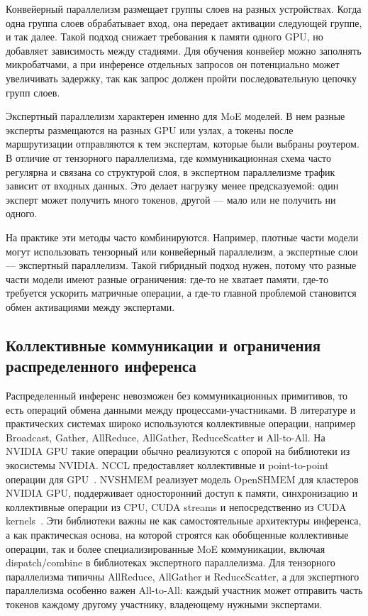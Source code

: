 Конвейерный параллелизм размещает группы слоев на разных устройствах. Когда одна группа слоев обрабатывает вход, она передает активации следующей группе, и так далее. Такой подход снижает требования к памяти одного GPU, но добавляет зависимость между стадиями. Для обучения конвейер можно заполнять микробатчами, а при инференсе отдельных запросов он потенциально может увеличивать задержку, так как запрос должен пройти последовательную цепочку групп слоев.

Экспертный параллелизм характерен именно для MoE моделей. В нем разные эксперты размещаются на разных GPU или узлах, а токены после маршрутизации отправляются к тем экспертам, которые были выбраны роутером. В отличие от тензорного параллелизма, где коммуникационная схема часто регулярна и связана со структурой слоя, в экспертном параллелизме трафик зависит от входных данных. Это делает нагрузку менее предсказуемой: один эксперт может получить много токенов, другой --- мало или не получить ни одного.

На практике эти методы часто комбинируются. Например, плотные части модели могут использовать тензорный или конвейерный параллелизм, а экспертные слои --- экспертный параллелизм. Такой гибридный подход нужен, потому что разные части модели имеют разные ограничения: где-то не хватает памяти, где-то требуется ускорить матричные операции, а где-то главной проблемой становится обмен активациями между экспертами.

\subsection{Коллективные коммуникации и ограничения распределенного инференса}

Распределенный инференс невозможен без коммуникационных примитивов, то есть операций обмена данными между процессами-участниками. В литературе и практических системах широко используются коллективные операции, например Broadcast, Gather, AllReduce, AllGather, ReduceScatter и All-to-All. На NVIDIA GPU такие операции обычно реализуются с опорой на библиотеки из экосистемы NVIDIA. NCCL предоставляет коллективные и point-to-point операции для GPU~\cite{nvidiaNCCLDocs}. NVSHMEM реализует модель OpenSHMEM для кластеров NVIDIA GPU, поддерживает односторонний доступ к памяти, синхронизацию и коллективные операции из CPU, CUDA streams и непосредственно из CUDA kernels~\cite{nvidiaNvshmem}. Эти библиотеки важны не как самостоятельные архитектуры инференса, а как практическая основа, на которой строятся как обобщенные коллективные операции, так и более специализированные MoE коммуникации, включая dispatch/combine в библиотеках экспертного параллелизма. Для тензорного параллелизма типичны AllReduce, AllGather и ReduceScatter, а для экспертного параллелизма особенно важен All-to-All: каждый участник может отправить часть токенов каждому другому участнику, владеющему нужными экспертами.

